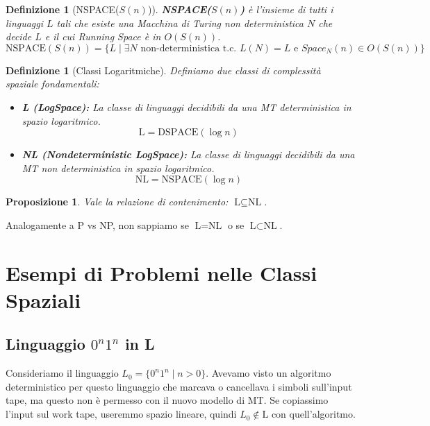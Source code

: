 \documentclass[a4paper, 11pt]{book} %
\newtheorem{definition}[theorem]{Definizione}
\newtheorem{proposition}[theorem]{Proposizione}
\theoremstyle{definition}
\begin{document}
\begin{definition}[NSPACE($S(n)$)]
\textbf{NSPACE($S(n)$)} è l'insieme di tutti i linguaggi $L$ tali che esiste una Macchina di Turing non deterministica $N$ che decide $L$ e il cui Running Space è in $O(S(n))$.
\[ \text{NSPACE}(S(n)) = \{ L \mid \exists N \text{ non-deterministica t.c. } L(N) = L \text{ e } Space_N(n) \in O(S(n)) \} \]
\end{definition}

\begin{definition}[Classi Logaritmiche]
Definiamo due classi di complessità spaziale fondamentali:
\begin{itemize}
    \item \textbf{L (LogSpace):} La classe di linguaggi decidibili da una MT deterministica in spazio logaritmico.
    \[ \text{L} = \text{DSPACE}(\log n) \]
    \item \textbf{NL (Nondeterministic LogSpace):} La classe di linguaggi decidibili da una MT non deterministica in spazio logaritmico.
    \[ \text{NL} = \text{NSPACE}(\log n) \]
\end{itemize}
\end{definition}

\begin{proposition}
Vale la relazione di contenimento: $\text{L} \subseteq \text{NL}$.
\end{proposition}
Analogamente a P vs NP, non sappiamo se $\text{L} = \text{NL}$ o se $\text{L} \subset \text{NL}$.

\section{Esempi di Problemi nelle Classi Spaziali}

\subsection{Linguaggio $0^n1^n$ in L}

Consideriamo il linguaggio $L_0 = \{0^n1^n \mid n > 0\}$.
Avevamo visto un algoritmo deterministico per questo linguaggio che marcava o cancellava i simboli sull'input tape, ma questo non è permesso con il nuovo modello di MT. Se copiassimo l'input sul work tape, useremmo spazio lineare, quindi $L_0 \notin \text{L}$ con quell'algoritmo.
\end{document}
